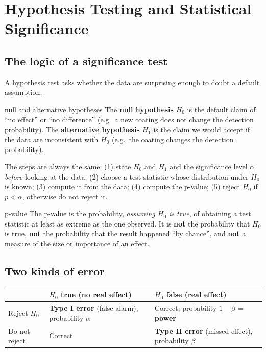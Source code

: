 \documentclass[11pt]{article}
\begin{document}
\section{Hypothesis Testing and Statistical Significance}
\subsection{The logic of a significance test}
A hypothesis test asks whether the data are surprising enough to doubt a default assumption.
\begin{definition}{null and alternative hypotheses}
The \textbf{null hypothesis} $H_0$ is the default claim of ``no effect'' or ``no difference'' (e.g.\ a new coating does not change the detection probability). The \textbf{alternative hypothesis} $H_1$ is the claim we would accept if the data are inconsistent with $H_0$ (e.g.\ the coating changes the detection probability).
\end{definition}
The steps are always the same: (1) state $H_0$ and $H_1$ and the significance level $\alpha$ \emph{before} looking at the data; (2) choose a test statistic whose distribution under $H_0$ is known; (3) compute it from the data; (4) compute the p-value; (5) reject $H_0$ if $p<\alpha$, otherwise do not reject it.

\begin{definition}{p-value}
The p-value is the probability, \emph{assuming $H_0$ is true}, of obtaining a test statistic at least as extreme as the one observed. It is \textbf{not} the probability that $H_0$ is true, \textbf{not} the probability that the result happened ``by chance'', and \textbf{not} a measure of the size or importance of an effect.
\end{definition}

\subsection{Two kinds of error}
\begin{center}\renewcommand{\arraystretch}{1.3}
\begin{tabular}{l>{\raggedright\arraybackslash}p{5.2cm}>{\raggedright\arraybackslash}p{5.2cm}}\toprule & $H_0$ true (no real effect) & $H_0$ false (real effect)\\\midrule
Reject $H_0$ & \textbf{Type I error} (false alarm), probability $\alpha$ & Correct; probability $1-\beta$ = \textbf{power}\\
Do not reject & Correct & \textbf{Type II error} (missed effect), probability $\beta$\\\bottomrule\end{tabular}\end{center}
\end{document}
